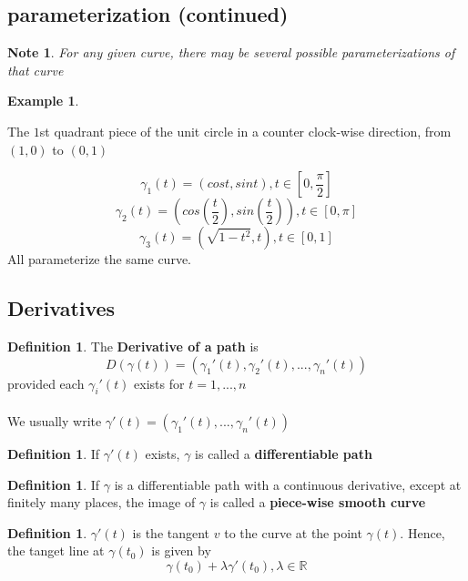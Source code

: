 \documentclass[12pt]{article}
\theoremstyle{plain}
\newtheorem*{note}{Note}
\newtheorem{example}[theorem]{Example}
\theoremstyle{definition}
\newtheorem{definition}[theorem]{Definition}
\begin{document}
\subsection{parameterization (continued)}

\begin{note}
	For any given curve, there may be several possible parameterizations of that curve
\end{note}

\begin{example}

\end{example} The $1$st quadrant piece of the unit circle in a counter clock-wise direction, from $(1,0)$ to $(0,1)$

$$\gamma_1 (t) = (cost, sint), t\in [0, \frac{\pi}{2}]$$
$$\gamma_2 (t) = (cos(\frac{t}{2}), sin(\frac{t}{2})), t\in [0, \pi]$$
$$\gamma_3 (t) = (\sqrt{1-t^2}, t), t\in [0, 1]$$
All parameterize the same curve.

\subsection{Derivatives}

\begin{definition}
	The \textbf{Derivative of a path} is
	$$D(\gamma(t)) = (\gamma_1'(t), \gamma_2'(t), ... , \gamma_n'(t))$$
	provided each $\gamma_i'(t)$ exists for $t=1,...,n$\\
	\\
	We usually write $\gamma' (t) = (\gamma_1'(t),...,\gamma_n'(t))$
\end{definition}

\begin{definition}
	If $\gamma'(t)$ exists, $\gamma$ is called a \textbf{differentiable path}
\end{definition}

\begin{definition}
	If $\gamma$ is a differentiable path with a continuous derivative, except at finitely many places, the image of $\gamma$ is called a \textbf{piece-wise smooth curve}
\end{definition}

\begin{definition}
	$\gamma'(t)$ is the tangent $v$ to the curve at the point $\gamma (t)$. Hence, the tanget line at $\gamma (t_0)$ is given by
	$$\gamma (t_0) + \lambda \gamma ' (t_0), \lambda \in \mathbb{R}$$
\end{definition}
\end{document}
